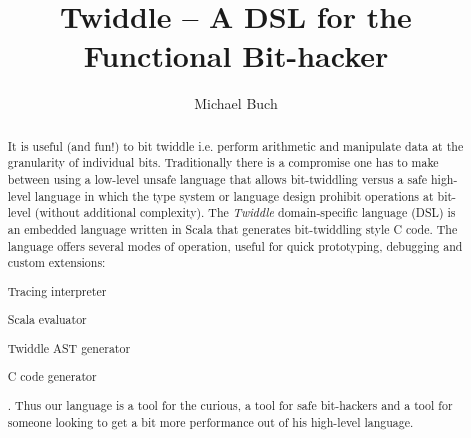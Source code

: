 \documentclass{article}
\title{Twiddle -- A DSL for the Functional Bit-hacker}
\author{Michael Buch}
\begin{document}
\maketitle
\frenchspacing

\begin{abstract}
It is useful (and fun!) to bit twiddle i.e. perform arithmetic and manipulate data at the granularity of individual bits. Traditionally there is a compromise one has to make between using a low-level unsafe language that allows bit-twiddling versus a safe high-level language in which the type system or language design prohibit operations at bit-level (without additional complexity). The \textit{Twiddle} domain-specific language (DSL) is an embedded language written in Scala that generates bit-twiddling style C code. The language offers several modes of operation, useful for quick prototyping, debugging and custom extensions:
\begin{enumerate*}[label=(\arabic*)]
	\item Tracing interpreter
	\item Scala evaluator
	\item Twiddle AST generator
	\item C code generator
\end{enumerate*}.
Thus our language is a tool for the curious, a tool for safe bit-hackers and a tool for someone looking to get a bit more performance out of his high-level language.
\end{abstract}
\end{document}
